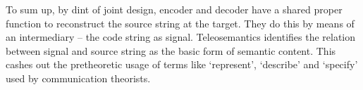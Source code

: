 
To sum up, by dint of joint design, encoder and decoder have a shared proper function to reconstruct the source string at the target.
They do this by means of an intermediary -- the code string as signal.
Teleosemantics identifies the relation between signal and source string as the basic form of semantic content.
This cashes out the pretheoretic usage of terms like `represent', `describe' and `specify' used by communication theorists.



